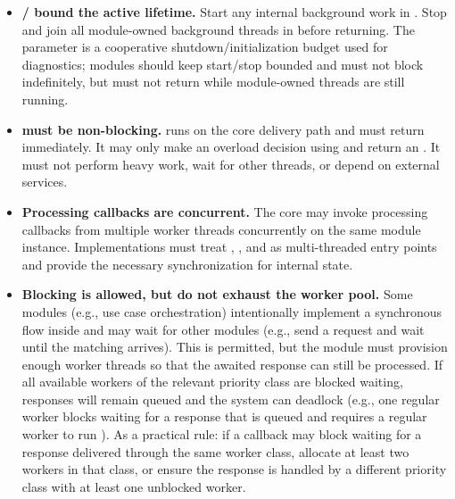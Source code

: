 \begin{itemize}
    \item \textbf{/ bound the active lifetime.} Start any internal background work in . Stop and join all module-owned background threads in  before returning. The  parameter is a cooperative shutdown/initialization budget used for diagnostics; modules should keep start/stop bounded and must not block indefinitely, but  must not return while module-owned threads are still running.
    \item \textbf{ must be non-blocking.}  runs on the core delivery path and must return immediately. It may only make an overload decision using  and return an . It must not perform heavy work, wait for other threads, or depend on external services.
    \item \textbf{Processing callbacks are concurrent.} The core may invoke processing callbacks from multiple worker threads concurrently on the same module instance. Implementations must treat , , and  as multi-threaded entry points and provide the necessary synchronization for internal state.
    \item \textbf{Blocking is allowed, but do not exhaust the worker pool.}
    Some modules (e.g., use case orchestration) intentionally implement a synchronous flow inside  and may wait for other modules (e.g., send a request and wait until the matching  arrives). This is permitted, but the module must provision enough worker threads so that the awaited response can still be processed.
    If all available workers of the relevant priority class are blocked waiting, responses will remain queued and the system can deadlock (e.g., one regular worker blocks waiting for a response that is queued and requires a regular worker to run ).
    As a practical rule: if a callback may block waiting for a response delivered through the same worker class, allocate at least two workers in that class, or ensure the response is handled by a different priority class with at least one unblocked worker.


\end{itemize}
